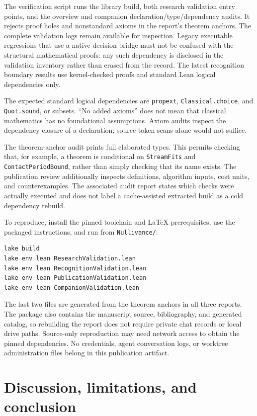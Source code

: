 \documentclass[11pt,a4paper]{article}
\begin{document}
The verification script runs the library build, both research validation
entry points, and the overview and companion declaration/type/dependency audits.
It rejects proof holes and nonstandard axioms in the report's theorem anchors.
The complete validation logs remain available for inspection. Legacy executable
regressions that use a native decision bridge must not be confused with the
structural mathematical proofs: any such dependency is disclosed in the
validation inventory rather than erased from the record. The latest
recognition boundary results use kernel-checked proofs and standard Lean
logical dependencies only.

The expected standard logical dependencies are \nolinkurl{propext},
\nolinkurl{Classical.choice}, and \nolinkurl{Quot.sound}, or subsets.
``No added axioms'' does not mean that classical mathematics has no foundational
assumptions. Axiom audits inspect the dependency closure of a declaration;
source-token scans alone would not suffice.

The theorem-anchor audit prints full elaborated types. This permits checking
that, for example, a theorem is conditional on \nolinkurl{StreamFits} and
\nolinkurl{ContactPeriodBound}, rather than simply checking that its name
exists. The publication review additionally inspects definitions, algorithm
inputs, cost units, and counterexamples. The associated audit report states
which checks were actually executed and does not label a cache-assisted
extracted build as a cold dependency rebuild.

To reproduce, install the pinned toolchain and LaTeX prerequisites, use the
packaged instructions, and run from \nolinkurl{Nullivance/}:
\begin{verbatim}
lake build
lake env lean ResearchValidation.lean
lake env lean RecognitionValidation.lean
lake env lean PublicationValidation.lean
lake env lean CompanionValidation.lean
\end{verbatim}
The last two files are generated from the theorem anchors in all three reports.
The package also contains the manuscript source, bibliography, and generated
catalog, so rebuilding the report does not require private chat records or
local drive paths. Source-only reproduction may need network access to obtain
the pinned dependencies. No credentials, agent conversation logs, or worktree
administration files belong in this publication artifact.

\section{Discussion, limitations, and conclusion}
\end{document}
